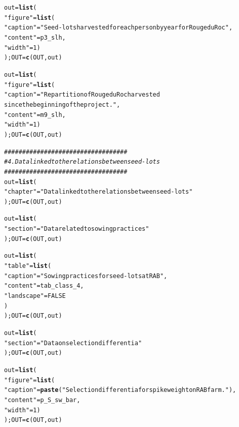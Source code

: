 \documentclass{article}\usepackage[]{graphicx}\usepackage[]{color}
\makeatletter
\newcommand{\hlnum}[1]{\textcolor[rgb]{0.686,0.059,0.569}{#1}}%
\newcommand{\hlstr}[1]{\textcolor[rgb]{0.192,0.494,0.8}{#1}}%
\newcommand{\hlcom}[1]{\textcolor[rgb]{0.678,0.584,0.686}{\textit{#1}}}%
\newcommand{\hlstd}[1]{\textcolor[rgb]{0.345,0.345,0.345}{#1}}%
\newcommand{\hlkwb}[1]{\textcolor[rgb]{0.69,0.353,0.396}{#1}}%
\newcommand{\hlkwd}[1]{\textcolor[rgb]{0.737,0.353,0.396}{\textbf{#1}}}%
\newenvironment{kframe}{%
 \def\at@end@of@kframe{}%
 \ifinner\ifhmode%
  \def\at@end@of@kframe{\end{minipage}}%
  \begin{minipage}{\columnwidth}%
 \fi\fi%
 \def\FrameCommand##1{\hskip\@totalleftmargin \hskip-\fboxsep
 \colorbox{shadecolor}{##1}\hskip-\fboxsep
     \hskip-\linewidth \hskip-\@totalleftmargin \hskip\columnwidth}%
 \MakeFramed {\advance\hsize-\width
   \@totalleftmargin\z@ \linewidth\hsize
   \@setminipage}}%
 {\par\unskip\endMakeFramed%
 \at@end@of@kframe}
\newenvironment{knitrout}{}{} %
\makeatother
\begin{document}
\begin{knitrout}
\begin{kframe}
\begin{alltt}
\hlstd{out} \hlkwb{=} \hlkwd{list}\hlstd{(}
        \hlstr{"figure"} \hlstd{=} \hlkwd{list}\hlstd{(}
                \hlstr{"caption"} \hlstd{=} \hlstr{"Seed-lots harvested for each person by year for Rouge du Roc"}\hlstd{,}
                \hlstr{"content"} \hlstd{= p3_slh,}
                \hlstr{"width"} \hlstd{=} \hlnum{1}\hlstd{)}
        \hlstd{); OUT} \hlkwb{=} \hlkwd{c}\hlstd{(OUT, out)}

\hlstd{out} \hlkwb{=} \hlkwd{list}\hlstd{(}
        \hlstr{"figure"} \hlstd{=} \hlkwd{list}\hlstd{(}
                \hlstr{"caption"} \hlstd{=} \hlstr{"Repartition of Rouge du Roc harvested 
		since the beginning of the project."}\hlstd{,}
                \hlstr{"content"} \hlstd{= m9_slh,}
                \hlstr{"width"} \hlstd{=} \hlnum{1}\hlstd{)}
        \hlstd{); OUT} \hlkwb{=} \hlkwd{c}\hlstd{(OUT, out)}


\hlcom{##################################}
\hlcom{# 4. Data linked to the relations between seed-lots}
\hlcom{##################################}
\hlstd{out} \hlkwb{=} \hlkwd{list}\hlstd{(}
        \hlstr{"chapter"} \hlstd{=} \hlstr{"Data linked to the relations between seed-lots"}
        \hlstd{); OUT} \hlkwb{=} \hlkwd{c}\hlstd{(OUT, out)}


\hlstd{out} \hlkwb{=} \hlkwd{list}\hlstd{(}
        \hlstr{"section"} \hlstd{=} \hlstr{"Data related to sowing practices"}
        \hlstd{); OUT} \hlkwb{=} \hlkwd{c}\hlstd{(OUT, out)}

\hlstd{out} \hlkwb{=} \hlkwd{list}\hlstd{(}
        \hlstr{"table"} \hlstd{=} \hlkwd{list}\hlstd{(}
                \hlstr{"caption"} \hlstd{=} \hlstr{"Sowing practices for seed-lots at RAB"}\hlstd{,}
                \hlstr{"content"} \hlstd{= tab_class_4,}
                \hlstr{"landscape"} \hlstd{=} \hlnum{FALSE}
                \hlstd{)}
        \hlstd{); OUT} \hlkwb{=} \hlkwd{c}\hlstd{(OUT, out)}


\hlstd{out} \hlkwb{=} \hlkwd{list}\hlstd{(}
        \hlstr{"section"} \hlstd{=} \hlstr{"Data on selection differentia"}
        \hlstd{); OUT} \hlkwb{=} \hlkwd{c}\hlstd{(OUT, out)}

\hlstd{out} \hlkwb{=} \hlkwd{list}\hlstd{(}
        \hlstr{"figure"} \hlstd{=} \hlkwd{list}\hlstd{(}
                \hlstr{"caption"} \hlstd{=} \hlkwd{paste}\hlstd{(}\hlstr{"Selection differentia for spike weight on RAB farm."}\hlstd{),}
                \hlstr{"content"} \hlstd{= p_S_sw_bar,}
                \hlstr{"width"} \hlstd{=} \hlnum{1}\hlstd{)}
        \hlstd{); OUT} \hlkwb{=} \hlkwd{c}\hlstd{(OUT, out)}


\end{alltt}
\end{kframe}
\end{knitrout}
\end{document}
